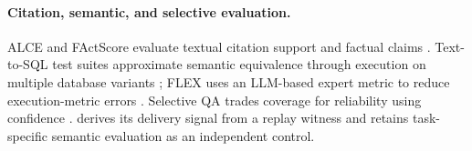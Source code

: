 \paragraph{Citation, semantic, and selective evaluation.}
ALCE and FActScore evaluate textual citation support and factual claims \citep{gao2023alce,min2023factscore}. Text-to-SQL test suites approximate semantic equivalence through execution on multiple database variants \citep{zhong2020testsuite}; FLEX uses an LLM-based expert metric to reduce execution-metric errors \citep{kim2025flex}. Selective QA trades coverage for reliability using confidence \citep{kamath2020selective}. \ledger derives its delivery signal from a replay witness and retains task-specific semantic evaluation as an independent control.
